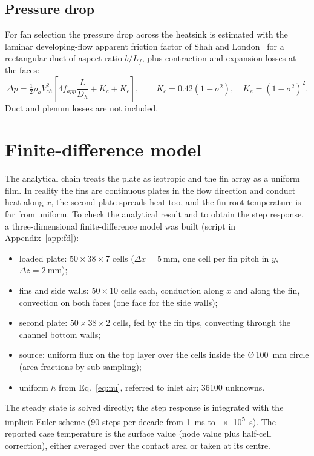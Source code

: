 \documentclass[11pt,a4paper]{article}
\begin{document}
\subsection{Pressure drop}\label{sec:dp}

For fan selection the pressure drop across the heatsink is estimated with the laminar developing-flow apparent friction factor of Shah and London~\cite{shah1978} for a rectangular duct of aspect ratio $b/L_f$, plus contraction and expansion losses at the faces:
\begin{equation}
\Delta p = \tfrac12\rho_a V_{ch}^2\left[4 f_{app}\frac{L}{D_h} + K_c + K_e\right],\qquad
K_c = 0.42(1-\sigma^2),\quad K_e=(1-\sigma^2)^2 .
\label{eq:dp}
\end{equation}
Duct and plenum losses are not included.

\section{Finite-difference model}\label{sec:fd}

The analytical chain treats the plate as isotropic and the fin array as a uniform film. In reality the fins are continuous plates in the flow direction and conduct heat along $x$, the second plate spreads heat too, and the fin-root temperature is far from uniform. To check the analytical result and to obtain the step response, a three-dimensional finite-difference model was built (script in Appendix~\ref{app:fd}):
\begin{itemize}
\item loaded plate: $50\times38\times7$ cells ($\Delta x=\SI{5}{\milli\metre}$, one cell per fin pitch in $y$, $\Delta z=\SI{2}{\milli\metre}$);
\item fins and side walls: $50\times10$ cells each, conduction along $x$ and along the fin, convection on both faces (one face for the side walls);
\item second plate: $50\times38\times2$ cells, fed by the fin tips, convecting through the channel bottom walls;
\item source: uniform flux on the top layer over the cells inside the \O\,\SI{100}{\milli\metre} circle (area fractions by sub-sampling);
\item uniform $h$ from Eq.~\eqref{eq:nu}, referred to inlet air; \num{36100} unknowns.
\end{itemize}
The steady state is solved directly; the step response is integrated with the implicit Euler scheme (90 steps per decade from \SI{1}{\milli\second} to \SI{e5}{\second}). The reported case temperature is the surface value (node value plus half-cell correction), either averaged over the contact area or taken at its centre.
\end{document}
